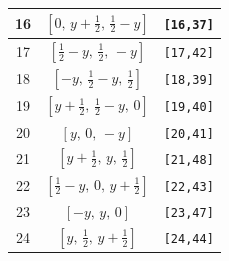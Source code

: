 \documentclass[fleqn,8pt]{jsarticle}
\begin{document}
\begin{longtable}{ccc}
16 & $\left[ 0,\, y + \frac{1}{2},\, \frac{1}{2} - y \right]$ & {\tt [16,37]} \\ \hline
17 & $\left[ \frac{1}{2} - y,\, \frac{1}{2},\, - y \right]$ & {\tt [17,42]} \\ \hline
18 & $\left[ - y,\, \frac{1}{2} - y,\, \frac{1}{2} \right]$ & {\tt [18,39]} \\ \hline
19 & $\left[ y + \frac{1}{2},\, \frac{1}{2} - y,\, 0 \right]$ & {\tt [19,40]} \\ \hline
20 & $\left[ y,\, 0,\, - y \right]$ & {\tt [20,41]} \\ \hline
21 & $\left[ y + \frac{1}{2},\, y,\, \frac{1}{2} \right]$ & {\tt [21,48]} \\ \hline
22 & $\left[ \frac{1}{2} - y,\, 0,\, y + \frac{1}{2} \right]$ & {\tt [22,43]} \\ \hline
23 & $\left[ - y,\, y,\, 0 \right]$ & {\tt [23,47]} \\ \hline
24 & $\left[ y,\, \frac{1}{2},\, y + \frac{1}{2} \right]$ & {\tt [24,44]} \\
\end{longtable}
\renewcommand{\arraystretch}{1.2}
\end{document}
